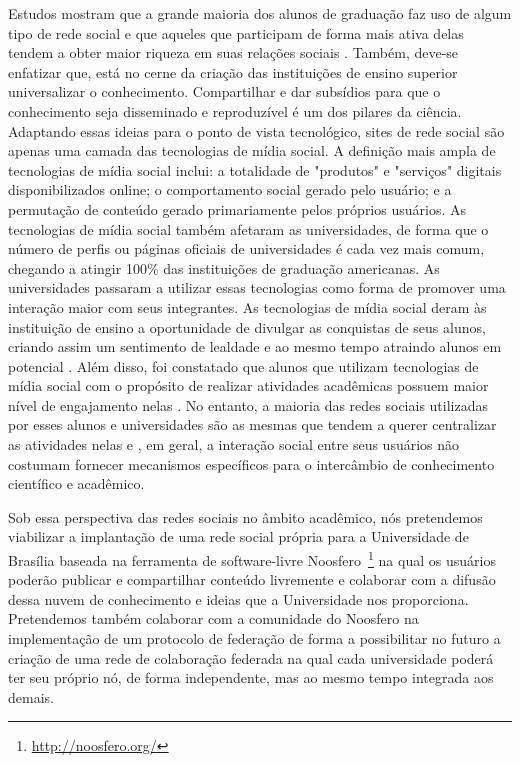 Estudos mostram que a grande maioria dos alunos de graduação faz uso de algum tipo de rede social e que aqueles que participam de forma mais ativa delas tendem a obter maior riqueza em suas relações sociais . Também, deve-se enfatizar que, está no cerne da criação das instituições de ensino superior universalizar o conhecimento. Compartilhar e dar subsídios para que o conhecimento seja disseminado e reproduzível é um dos pilares da ciência. Adaptando essas ideias para o ponto de vista tecnológico, sites de rede social são apenas uma camada das tecnologias de mídia social. A definição mais ampla de tecnologias de mídia social inclui: a totalidade de "produtos" e "serviços" digitais disponibilizados online; o comportamento social gerado pelo usuário; e a permutação de conteúdo gerado primariamente pelos próprios usuários.
As tecnologias de mídia social também afetaram as universidades, de forma que o número de perfis ou páginas oficiais de universidades é cada vez mais comum, chegando a atingir 100\% das instituições de graduação americanas. As universidades passaram a utilizar essas tecnologias como forma de promover uma interação maior com seus integrantes. As tecnologias de mídia social deram às instituição de ensino a oportunidade de divulgar as conquistas de seus alunos, criando assim um sentimento de lealdade e ao mesmo tempo atraindo alunos em potencial \cite{solis2008}. Além disso, foi constatado que alunos que utilizam tecnologias de mídia social com o propósito de realizar atividades acadêmicas possuem maior nível de engajamento nelas  \cite{ccsse2009}. No entanto, a maioria das redes sociais utilizadas por esses alunos e universidades são as mesmas que tendem a querer centralizar as atividades nelas e , em geral, a interação social entre seus usuários não costumam fornecer mecanismos específicos para o intercâmbio de conhecimento científico e acadêmico.

Sob essa perspectiva das redes sociais no âmbito acadêmico, nós pretendemos viabilizar a implantação de uma rede social própria para a Universidade de Brasília baseada na ferramenta de software-livre Noosfero~\footnote{\url{http://noosfero.org/}} na qual os usuários poderão publicar e compartilhar conteúdo livremente e colaborar com a difusão dessa nuvem de conhecimento e ideias que a Universidade nos proporciona. Pretendemos também colaborar com a comunidade do Noosfero na implementação de um protocolo de federação de forma a possibilitar no futuro a criação de uma rede de colaboração federada na qual cada universidade poderá ter seu próprio nó, de forma independente, mas ao mesmo tempo integrada aos demais.

